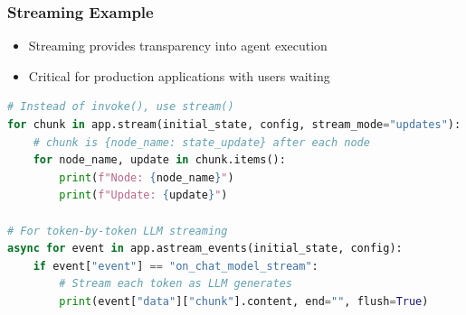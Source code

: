 \begin{frame}[fragile]\frametitle{Streaming Example}

      \begin{itemize}
        \item Streaming provides transparency into agent execution
        \item Critical for production applications with users waiting
      \end{itemize}

\begin{lstlisting}[language=Python]
# Instead of invoke(), use stream()
for chunk in app.stream(initial_state, config, stream_mode="updates"):
    # chunk is {node_name: state_update} after each node
    for node_name, update in chunk.items():
        print(f"Node: {node_name}")
        print(f"Update: {update}")

# For token-by-token LLM streaming
async for event in app.astream_events(initial_state, config):
    if event["event"] == "on_chat_model_stream":
        # Stream each token as LLM generates
        print(event["data"]["chunk"].content, end="", flush=True)
      \end{lstlisting}
\end{frame}
